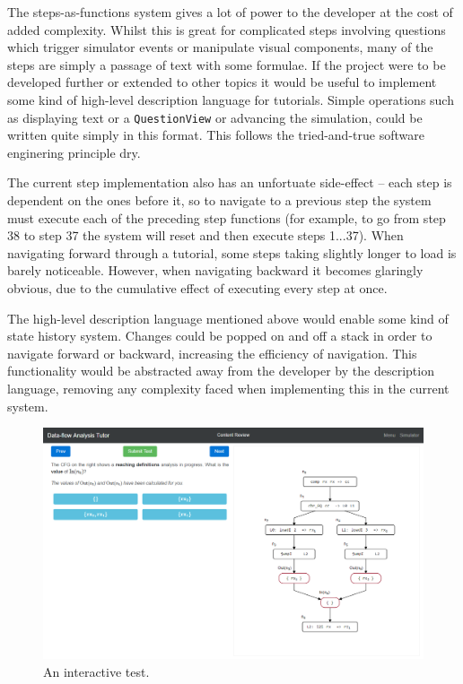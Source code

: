 \documentclass[bsc,twoside,singlespacing,parskip,logo,notimes,normalheadings]{infthesis}
\begin{document}
        The steps-as-functions system gives a lot of power to the
        developer at the cost of added complexity. Whilst this is
        great for complicated steps involving questions which trigger
        simulator events or manipulate visual components, many of the
        steps are simply a passage of text with some formulae. If the
        project were to be developed further or extended to other
        topics it would be useful to implement some kind of high-level
        description language for tutorials. Simple operations such as
        displaying text or a {\tt QuestionView} or advancing the
        simulation, could be written quite simply in this format. This
        follows the tried-and-true software enginering principle
        \gls{dry}.

        The current step implementation also has an unfortuate
        side-effect -- each step is dependent on the ones before it,
        so to navigate to a previous step the system must execute each
        of the preceding step functions (for example, to go from step
        38 to step 37 the system will reset and then execute steps
        1...37). When navigating forward through a tutorial, some
        steps taking slightly longer to load is barely
        noticeable. However, when navigating backward it becomes
        glaringly obvious, due to the cumulative effect of executing
        every step at once.

        The high-level description language mentioned above would
        enable some kind of state history system. Changes could be
        popped on and off a stack in order to navigate forward or
        backward, increasing the efficiency of navigation. This
        functionality would be abstracted away from the developer by
        the description language, removing any complexity faced when
        implementing this in the current system.

        \begin{figure}[!b]
          \centering
          \includegraphics[width=\textwidth, trim=0 0 0 0]{img/test.png}
          \captionsetup{width=\textwidth, justification=centering}
          \caption{An interactive test.}\label{fig:testing}
          \vspace{-5mm}
        \end{figure}
\end{document}
